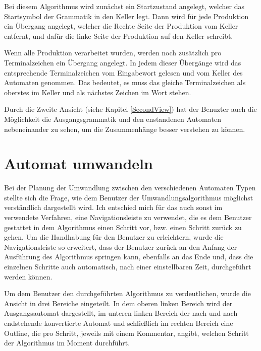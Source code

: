 Bei diesem Algorithmus wird zunächst ein Startzustand angelegt, welcher das
Startsymbol der Grammatik in den Keller legt. Dann wird für jede Produktion
ein Übergang angelegt, welcher die Rechte Seite der Produktion vom Keller
entfernt, und dafür die linke Seite der Produktion auf den Keller
schreibt.\vspace{10pt}

Wenn alle Produktion verarbeitet wurden, werden noch zusätzlich pro
Terminalzeichen ein Übergang angelegt. In jedem dieser Übergänge wird das
entsprechende Terminalzeichen vom Eingabewort gelesen und vom Keller des
Automaten genommen. Das bedeutet, es muss das gleiche Terminalzeichen als
oberstes im Keller  und als nächstes Zeichen im Wort stehen.\vspace{10pt}

Durch die Zweite Ansicht (siehe Kapitel \ref{SecondView}) hat der Benuzter auch
die Möglichkeit die Ausgangsgrammatik und den enstandenen Automaten nebeneinander
zu sehen, um die Zusammenhänge besser verstehen zu können.\vspace{10pt}


\section{Automat umwandeln}\label{ConverToMachine}

Bei der Planung der Umwandlung zwischen den verschiedenen Automaten Typen
stellte sich die Frage, wie dem Benutzer der Umwandlungsalgorithmus möglichst
verständlich dargestellt wird. Ich entschied mich für das auch sonst im
\gtitool verwendete Verfahren, eine Navigationsleiste zu verwendet, die es dem
Benutzer gestattet in dem Algorithmus einen Schritt vor, bzw. einen Schritt
zurück zu gehen. Um die Handhabung für den Benutzer zu erleichtern, wurde die
Navigationsleiste so erweitert, dass der Benutzer zurück an den Anfang der
Ausführung des Algorithmus springen kann, ebenfalls an das Ende und, dass die
einzelnen Schritte auch automatisch, nach einer einstellbaren Zeit, durchgeführt
werden können.\vspace{10pt}

Um dem Benutzer den durchgeführten Algorithmus zu verdeutlichen, wurde die
Ansicht in drei Bereiche eingeteilt. In dem oberen linken Bereich wird der
Ausgangsautomat dargestellt, im unteren linken Bereich der nach und nach
endstehende konvertierte Automat und schließlich im rechten Bereich eine
Outline, die pro Schritt, jeweils mit einem Kommentar, angibt, welchen Schritt
der Algorithmus im Moment durchführt.\vspace{10pt}

